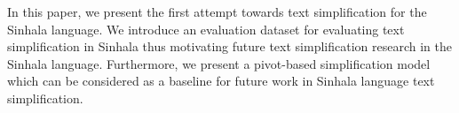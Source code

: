 In this paper, we present the first attempt towards text simplification for the Sinhala language. We introduce an evaluation dataset for evaluating text simplification in Sinhala thus motivating future text simplification research in the Sinhala language. Furthermore, we present a pivot-based simplification model which can be considered as a baseline for future work in Sinhala language text simplification.
